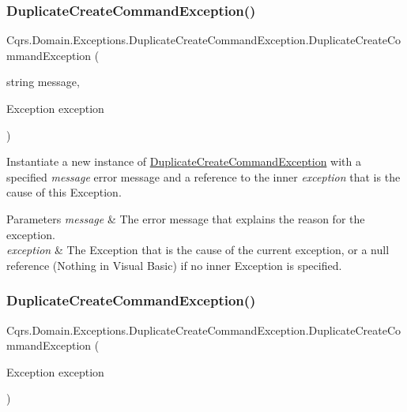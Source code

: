\subsubsection{\texorpdfstring{Duplicate\+Create\+Command\+Exception()}{DuplicateCreateCommandException()}\hspace{0.1cm}{\footnotesize\ttfamily [1/3]}}
{\footnotesize\ttfamily Cqrs.\+Domain.\+Exceptions.\+Duplicate\+Create\+Command\+Exception.\+Duplicate\+Create\+Command\+Exception (\begin{DoxyParamCaption}\item[{string}]{message,  }\item[{Exception}]{exception }\end{DoxyParamCaption})}



Instantiate a new instance of \hyperlink{classCqrs_1_1Domain_1_1Exceptions_1_1DuplicateCreateCommandException}{Duplicate\+Create\+Command\+Exception} with a specified {\itshape message} error message and a reference to the inner {\itshape exception}  that is the cause of this Exception. 


\begin{DoxyParams}{Parameters}
{\em message} & The error message that explains the reason for the exception.\\
\hline
{\em exception} & The Exception that is the cause of the current exception, or a null reference (Nothing in Visual Basic) if no inner Exception is specified.\\
\hline
\end{DoxyParams}
\mbox{\label{classCqrs_1_1Domain_1_1Exceptions_1_1DuplicateCreateCommandException_af7b3528197bfb3e1b1b67ac286268913_af7b3528197bfb3e1b1b67ac286268913}} 
\subsubsection{\texorpdfstring{Duplicate\+Create\+Command\+Exception()}{DuplicateCreateCommandException()}\hspace{0.1cm}{\footnotesize\ttfamily [2/3]}}
{\footnotesize\ttfamily Cqrs.\+Domain.\+Exceptions.\+Duplicate\+Create\+Command\+Exception.\+Duplicate\+Create\+Command\+Exception (\begin{DoxyParamCaption}\item[{Exception}]{exception }\end{DoxyParamCaption})}



